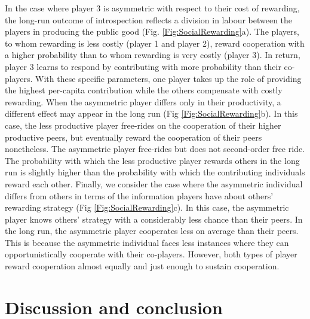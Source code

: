 \documentclass[11pt]{article}
\theoremstyle{plainCl1}
\theoremstyle{plainCl2}
\begin{document}
\noindent In the case where player 3 is asymmetric with respect to their cost of rewarding, the long-run outcome of introspection reflects a division in labour between the players in producing the public good (Fig. \ref{Fig:SocialRewarding}a). The players, to whom rewarding is less costly (player 1 and player 2), reward cooperation with a higher probability than to whom rewarding is very costly (player 3). In return, player 3 learns to respond by contributing with more probability than their co-players. With these specific parameters, one player takes up the role of providing the highest per-capita contribution while the others compensate with costly rewarding. When the asymmetric player differs only in their productivity, a different effect may appear in the long run (Fig \ref{Fig:SocialRewarding}b). In this case, the less productive player free-rides on the cooperation of their higher productive peers, but eventually reward the cooperation of their peers nonetheless. The asymmetric player free-rides but does not second-order free ride. The probability with which the less productive player rewards others in the long run is slightly higher than the probability with which the contributing individuals reward each other. Finally, we consider the case where the asymmetric individual differs from others in terms of the information players have about others' rewarding strategy (Fig \ref{Fig:SocialRewarding}c). In this case, the asymmetric player knows others' strategy with a considerably less chance than their peers. In the long run, the asymmetric player cooperates less on average than their peers. This is because the asymmetric individual faces less instances where they can opportunistically cooperate with their co-players. However, both types of player reward cooperation almost equally and just enough to sustain cooperation. 

\section*{Discussion and conclusion}

\end{document}

